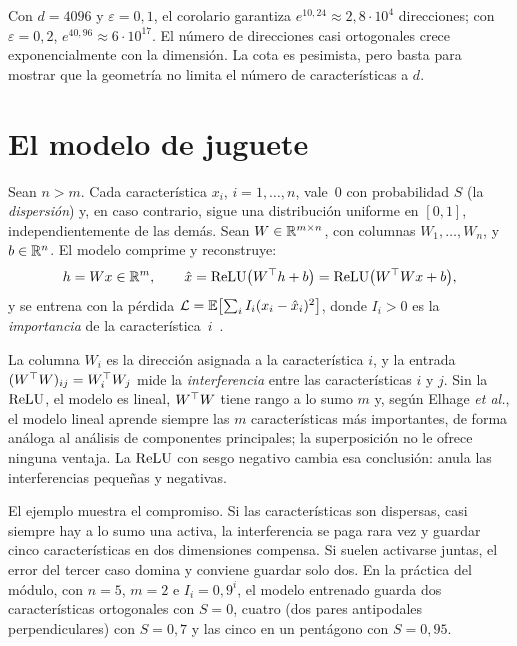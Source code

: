 Con $d=4096$ y $\varepsilon=0{,}1$, el corolario garantiza $e^{10{,}24}\approx 2{,}8\cdot 10^{4}$ direcciones; con $\varepsilon=0{,}2$, $e^{40{,}96}\approx 6\cdot 10^{17}$. El número de direcciones casi ortogonales crece exponencialmente con la dimensión. La cota es pesimista, pero basta para mostrar que la geometría no limita el número de características a $d$.

\section{El modelo de juguete}

\begin{definicion}\label{def:juguete}
Sean $n>m$. Cada característica $x_i$, $i=1,\dots,n$, vale~0 con probabilidad $S$ (la \emph{dispersión}) y, en caso contrario, sigue una distribución uniforme en $[0,1]$, independientemente de las demás. Sean $W\in\mathbb{R}^{m\times n}$, con columnas $W_1,\dots,W_n$, y $b\in\mathbb{R}^{n}$. El modelo comprime y reconstruye:
\[
h=Wx\in\mathbb{R}^{m},\qquad \hat x=\operatorname{ReLU}\bigl(W^{\top} h+b\bigr)=\operatorname{ReLU}\bigl(W^{\top} Wx+b\bigr),
\]
y se entrena con la pérdida $\mathcal{L}=\mathbb{E}\bigl[\sum_iI_i(x_i-\hat x_i)^{2}\bigr]$, donde $I_i>0$ es la \emph{importancia} de la característica~$i$~\cite[«Experiment Setup»]{elhage22}.
\end{definicion}

La columna $W_i$ es la dirección asignada a la característica $i$, y la entrada $(W^{\top} W)_{ij}=W_i^{\top} W_j$ mide la \emph{interferencia} entre las características $i$ y $j$. Sin la $\operatorname{ReLU}$, el modelo es lineal, $W^{\top} W$ tiene rango a lo sumo $m$ y, según Elhage \emph{et al.}, el modelo lineal aprende siempre las $m$ características más importantes, de forma análoga al análisis de componentes principales; la superposición no le ofrece ninguna ventaja. La $\operatorname{ReLU}$ con sesgo negativo cambia esa conclusión: anula las interferencias pequeñas y negativas.

\addtocounter{definicion}{1}%

El ejemplo muestra el compromiso. Si las características son dispersas, casi siempre hay a lo sumo una activa, la interferencia se paga rara vez y guardar cinco características en dos dimensiones compensa. Si suelen activarse juntas, el error del tercer caso domina y conviene guardar solo dos. En la práctica del módulo, con $n=5$, $m=2$ e $I_i=0{,}9^{i}$, el modelo entrenado guarda dos características ortogonales con $S=0$, cuatro (dos pares antipodales perpendiculares) con $S=0{,}7$ y las cinco en un pentágono con $S=0{,}95$.

